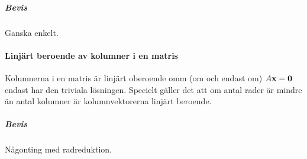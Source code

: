 \subparagraph{Bevis}
Ganska enkelt.

\paragraph{Linjärt beroende av kolumner i en matris}
Kolumnerna i en matris är linjärt oberoende omm (om och endast om) $A\vect{x} = \vect{0}$ endast har den triviala lösningen. Specielt gäller det att om antal rader är mindre än antal kolumner är kolumnvektorerna linjärt beroende.

\subparagraph{Bevis}
Någonting med radreduktion.
